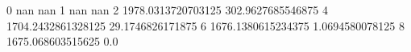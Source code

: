 0 nan nan
1 nan nan
2 1978.0313720703125 302.9627685546875
4 1704.2432861328125 29.1746826171875
6 1676.1380615234375 1.0694580078125
8 1675.068603515625 0.0
